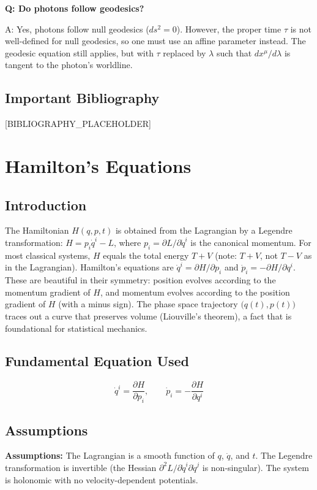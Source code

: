 \documentclass[11pt,openright]{book}
\begin{document}
\textbf{Q: Do photons follow geodesics?}

A: Yes, photons follow null geodesics ($ds^2 = 0$). However, the proper time $\tau$ is not well-defined for null geodesics, so one must use an affine parameter instead. The geodesic equation still applies, but with $\tau$ replaced by $\lambda$ such that $dx^\mu/d\lambda$ is tangent to the photon's worldline.
\section*{Important Bibliography}

[BIBLIOGRAPHY_PLACEHOLDER]


\chapter{Hamilton's Equations}

\section*{Introduction}

The Hamiltonian $H(q,p,t)$ is obtained from the Lagrangian by a Legendre transformation: $H = p_i\dot{q}^i - L$, where $p_i = \partial L/\partial\dot{q}^i$ is the canonical momentum. For most classical systems, $H$ equals the total energy $T + V$ (note: $T + V$, not $T - V$ as in the Lagrangian). Hamilton's equations are $\dot{q}^i = \partial H/\partial p_i$ and $\dot{p}_i = -\partial H/\partial q^i$. These are beautiful in their symmetry: position evolves according to the momentum gradient of $H$, and momentum evolves according to the position gradient of $H$ (with a minus sign). The phase space trajectory $\bigl(q(t), p(t)\bigr)$ traces out a curve that preserves volume (Liouville's theorem), a fact that is foundational for statistical mechanics.
\section*{Fundamental Equation Used}

\[
\dot{q}^i = \frac{\partial H}{\partial p_i},\qquad \dot{p}_i = -\frac{\partial H}{\partial q^i}
\]
\section*{Assumptions}

\textbf{Assumptions:} The Lagrangian is a smooth function of $q$, $\dot{q}$, and $t$. The Legendre transformation is invertible (the Hessian $\partial^2 L/\partial\dot{q}^i\partial\dot{q}^j$ is non-singular). The system is holonomic with no velocity-dependent potentials.
\end{document}
